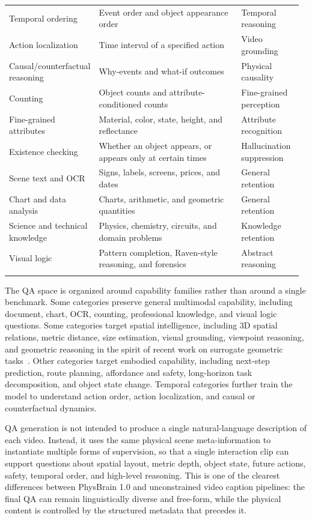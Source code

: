 \documentclass{llmxive}
\begin{document}
{\begin{longtable}{@{}p{0.27\linewidth}p{0.49\linewidth}p{0.21\linewidth}@{}}
Temporal ordering & Event order and object appearance order & Temporal reasoning \\
Action localization & Time interval of a specified action & Video grounding \\
Causal/counterfactual reasoning & Why-events and what-if outcomes & Physical causality \\
Counting & Object counts and attribute-conditioned counts & Fine-grained perception \\
Fine-grained attributes & Material, color, state, height, and reflectance & Attribute recognition \\
Existence checking & Whether an object appears, or appears only at certain times & Hallucination suppression \\
Scene text and OCR & Signs, labels, screens, prices, and dates & General retention \\
Chart and data analysis & Charts, arithmetic, and geometric quantities & General retention \\
Science and technical knowledge & Physics, chemistry, circuits, and domain problems & Knowledge retention \\
Visual logic & Pattern completion, Raven-style reasoning, and forensics & Abstract reasoning \\
\bottomrule
\label{tab:qa_families}
\end{longtable}
}


The QA space is organized around capability families rather than around a single benchmark. Some categories preserve general multimodal capability, including document, chart, OCR, counting, professional knowledge, and visual logic questions. Some categories target spatial intelligence, including 3D spatial relations, metric distance, size estimation, visual grounding, viewpoint reasoning, and geometric reasoning in the spirit of recent work on surrogate geometric tasks~\cite{Euclids_Gift_2025_arXiv}. Other categories target embodied capability, including next-step prediction, route planning, affordance and safety, long-horizon task decomposition, and object state change. Temporal categories further train the model to understand action order, action localization, and causal or counterfactual dynamics.

QA generation is not intended to produce a single natural-language description of each video. Instead, it uses the same physical scene meta-information to instantiate multiple forms of supervision, so that a single interaction clip can support questions about spatial layout, metric depth, object state, future actions, safety, temporal order, and high-level reasoning. This is one of the clearest differences between PhysBrain 1.0 and unconstrained video caption pipelines: the final QA can remain linguistically diverse and free-form, while the physical content is controlled by the structured metadata that precedes it.
\end{document}
